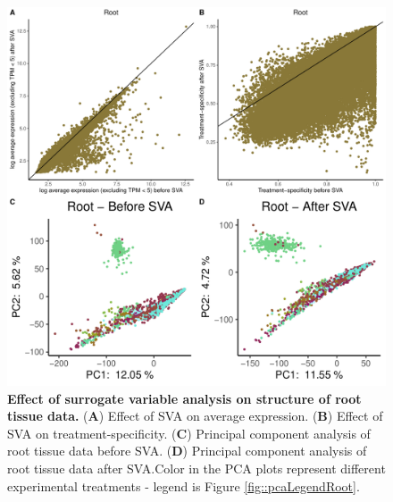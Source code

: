 \documentclass[12pt]{article}
\begin{document}
\begin{figure}[H]
\centering
\includegraphics[width = \linewidth]{figures/appendix_a/pca_beforeAndAfterSva_root_2023-02-21.pdf}
\caption{\textbf{Effect of surrogate variable analysis on structure of root tissue data.} (\textbf{A}) Effect of SVA on average expression. (\textbf{B}) Effect of SVA on treatment-specificity. (\textbf{C}) Principal component analysis of root tissue data before SVA. (\textbf{D}) Principal component analysis of root tissue data after SVA.Color in the PCA plots represent different experimental treatments - legend is Figure \ref{fig::pcaLegendRoot}.}%
\end{figure}
\end{document}
